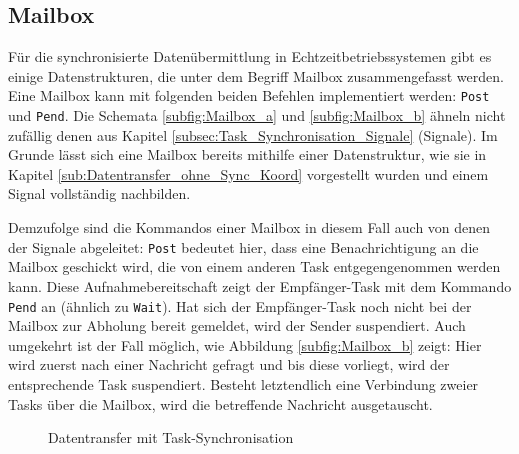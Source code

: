 \documentclass{llncs}
\begin{document}
\subsection{Mailbox}
Für die synchronisierte Datenübermittlung in Echtzeitbetriebssystemen gibt es einige Datenstrukturen, die unter dem Begriff Mailbox zusammengefasst werden. Eine Mailbox kann mit folgenden beiden Befehlen implementiert werden:
\texttt{Post} und \texttt{Pend}. Die Schemata \ref{subfig:Mailbox_a} und \ref{subfig:Mailbox_b} ähneln nicht zufällig denen aus Kapitel \ref{subsec:Task_Synchronisation_Signale} (Signale). Im Grunde lässt sich eine Mailbox bereits mithilfe einer Datenstruktur, wie sie in Kapitel \ref{sub:Datentransfer_ohne_Sync_Koord} vorgestellt wurden und einem Signal vollständig nachbilden.

Demzufolge sind die Kommandos einer Mailbox in diesem Fall auch von denen der Signale abgeleitet: \texttt{Post} bedeutet hier, dass eine Benachrichtigung an die Mailbox geschickt wird, die von einem anderen Task entgegengenommen werden kann. Diese Aufnahmebereitschaft zeigt der Empfänger-Task mit dem Kommando \texttt{Pend} an (ähnlich zu \texttt{Wait}). Hat sich der Empfänger-Task noch nicht bei der Mailbox zur Abholung bereit gemeldet, wird der Sender suspendiert. Auch umgekehrt ist der Fall möglich, wie Abbildung \ref{subfig:Mailbox_b} zeigt: Hier wird zuerst nach einer Nachricht gefragt und bis diese vorliegt, wird der entsprechende Task suspendiert. Besteht letztendlich eine Verbindung zweier Tasks über die Mailbox, wird die betreffende Nachricht ausgetauscht.
\begin{figure}[h]
	\centering
	\begin{subfigure}{.40\columnwidth} %
		\def\svgwidth{\columnwidth}
		
	\end{subfigure}
	\caption{\label{fig:Mailbox_gesamt}Datentransfer mit Task-Synchronisation \autocite[vgl.][99]{Cooling2017}}
\end{figure}
\end{document}
